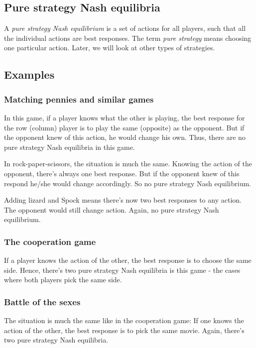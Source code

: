 \documentclass[12pt, a4paper]{article}
\begin{document}
\subsection{Pure strategy Nash equilibria}
A \textit{pure strategy Nash equilibrium} is a set of actions for all players, such that all the individual actions are best responses. The term \textit{pure strategy} means choosing one particular action. Later, we will look at other types of strategies.

\subsection{Examples}

\subsubsection{Matching pennies and similar games}
In this game, if a player knows what the other is playing, the best response for the row (column) player is to play the same (opposite) as the opponent. But if the opponent knew of this action, he would change his own. Thus, there are no pure strategy Nash equilibria in this game.

In rock-paper-scissors, the situation is much the same. Knowing the action of the opponent, there's always one best response. But if the opponent knew of this respond he/she would change accordingly. So no pure strategy Nash equilibrium.

Adding lizard and Spock means there's now two best responses to any action. The opponent would still change action. Again, no pure strategy Nash equilibrium.

\subsubsection{The cooperation game}
If a player knows the action of the other, the best response is to choose the same side. Hence, there's two pure strategy Nash equilibria is this game - the cases where both players pick the same side.

\subsubsection{Battle of the sexes}
The situation is much the same like in the cooperation game: If one knows the action of the other, the best response is to pick the same movie. Again, there's two pure strategy Nash equilibria.
\end{document}
